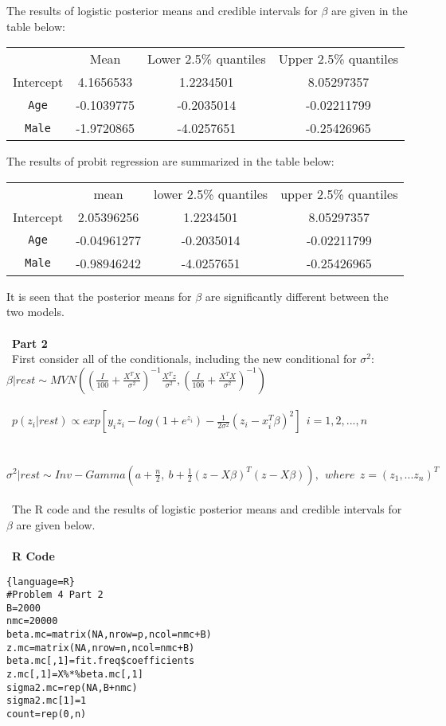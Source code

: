 \documentclass[12pt]{article}
\newenvironment{problem}[2][Problem]{\begin{trivlist}
\item[\hskip \labelsep {\bfseries #1}\hskip \labelsep {\bfseries #2.}]}{\end{trivlist}}
\begin{document}
\begin{problem}{4}
The results of logistic posterior means and credible intervals for $\beta$ are given in the table below:\\

  \begin{center}
  \begin{tabular}{ |c|c|c|c| }
  \hline
  ~\ & Mean & Lower 2.5\% quantiles & Upper 2.5\% quantiles  \\ 
  Intercept & 4.1656533 & 1.2234501 & 8.05297357  \\ 
  \texttt{Age} & -0.1039775 & -0.2035014 & -0.02211799  \\
  \texttt{Male} & -1.9720865 & -4.0257651 & -0.25426965  \\
  \hline
  \end{tabular}
  \end{center}
  
The results of probit regression are summarized in the table below:\\ 
  \begin{center}
  \begin{tabular}{ |c|c|c|c| }
  \hline
  ~\ & mean & lower 2.5\% quantiles & upper 2.5\% quantiles  \\ 
  Intercept & 2.05396256 & 1.2234501 & 8.05297357  \\ 
  \texttt{Age} & -0.04961277 & -0.2035014 & -0.02211799  \\
 \texttt{Male} & -0.98946242 & -4.0257651 & -0.25426965  \\
  \hline
  \end{tabular}
  \end{center}
 
It is seen that the posterior means for $\beta$ are significantly different between the two models.\\
\\\
\textbf{Part 2}
\\\
First consider all of the conditionals, including the new conditional for $\sigma^2$:\\
$\beta|rest \sim MVN\left(\left(\frac{I}{100}+\frac{X^T X}{\sigma^2}\right)^{-1}\frac{X^T z}{\sigma ^2}, \left(\frac{I}{100}+\frac{X^T X}{\sigma^2}\right)^{-1}\right)  $\\
\\\
$ p(z_i|rest)\propto exp[y_i z_i-log(1+e^{z_i})-\frac{1}{2\sigma^2}(z_i-x_i^T \beta)^2] ~\ i=1,2,...,n$\\
\\\
$\sigma^2|rest \sim Inv-Gamma(a+\frac{n}{2}, \ b+\frac{1}{2}(z-X\beta)^T(z-X\beta)), ~\ where ~\ z=(z_1,...z_n)^T $\\
\\\
The R code and the results of logistic posterior means and credible intervals for $\beta$ are given below. \\
\\\
\textbf{R Code}
\begin{lstlisting}{language=R}
#Problem 4 Part 2
B=2000
nmc=20000
beta.mc=matrix(NA,nrow=p,ncol=nmc+B)
z.mc=matrix(NA,nrow=n,ncol=nmc+B)
beta.mc[,1]=fit.freq$coefficients
z.mc[,1]=X%*%beta.mc[,1]
sigma2.mc=rep(NA,B+nmc)
sigma2.mc[1]=1
count=rep(0,n)


\end{lstlisting}
\end{problem}
\end{document}

